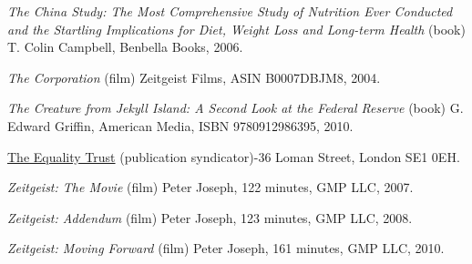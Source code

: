 \item
{\it The China Study: The Most Comprehensive Study of Nutrition Ever Conducted and the Startling Implications for Diet, Weight Loss and Long-term Health} (book)\crlf
T. Colin Campbell, Benbella Books, 2006.

\item
{\it The Corporation} (film)\crlf
Zeitgeist Films, ASIN B0007DBJM8, 2004.

\item
{\it The Creature from Jekyll Island: A Second Look at the Federal Reserve} (book)\crlf
G. Edward Griffin, American Media, ISBN 9780912986395, 2010.

\item
\href{http://www.equalitytrust.org.uk/resources/publications}{The Equality Trust} (publication syndicator)-36 Loman Street, London SE1 0EH.

\item
{\it Zeitgeist: The Movie} (film)\crlf
Peter Joseph, 122 minutes, GMP LLC, 2007.

\item
{\it Zeitgeist: Addendum} (film)\crlf
Peter Joseph, 123 minutes, GMP LLC, 2008.

\item
{\it Zeitgeist: Moving Forward} (film)\crlf
Peter Joseph, 161 minutes, GMP LLC, 2010.
\stopitemize

